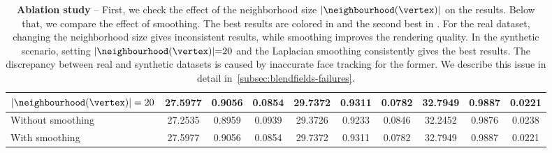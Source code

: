 \begin{table}[!t]
{\begin{tabular}{lccccccccc}
      $|\neighbourhood(\vertex)| = 20$ & \cellcolor{firstbestcolor}27.5977      & \cellcolor{firstbestcolor}0.9056         & \cellcolor{firstbestcolor}0.0854         & 29.7372                            & 0.9311                            & \cellcolor{firstbestcolor}0.0782  & \cellcolor{firstbestcolor}32.7949  & \cellcolor{firstbestcolor}0.9887  & \cellcolor{firstbestcolor}0.0221  \\
      \midrule
      Without smoothing                & \cellcolor{secondbestcolor}27.2535     & \cellcolor{secondbestcolor}0.8959        & \cellcolor{secondbestcolor}0.0939        & \cellcolor{secondbestcolor}29.3726 & \cellcolor{secondbestcolor}0.9233 & \cellcolor{secondbestcolor}0.0846 & \cellcolor{secondbestcolor}32.2452 & \cellcolor{secondbestcolor}0.9876 & \cellcolor{secondbestcolor}0.0238 \\
      With smoothing                   & \cellcolor{firstbestcolor}27.5977      & \cellcolor{firstbestcolor}0.9056         & \cellcolor{firstbestcolor}0.0854         & \cellcolor{firstbestcolor}29.7372  & \cellcolor{firstbestcolor}0.9311  & \cellcolor{firstbestcolor}0.0782  & \cellcolor{firstbestcolor}32.7949  & \cellcolor{firstbestcolor}0.9887  & \cellcolor{firstbestcolor}0.0221  \\
      \bottomrule
    \end{tabular}
  }
  \caption[Ablation study of components introduced in \blendfields]{\textbf{Ablation study} -- {
  First, we check the effect of the neighborhood size $|\neighbourhood(\vertex)|$ on the results.
  Below that, we compare the effect of smoothing.
  The best results are colored in  and the second
  best in .
  For the real dataset, changing the neighborhood size gives inconsistent
  results, while smoothing improves the rendering quality.
  In the synthetic scenario, setting $|\neighbourhood(\vertex)|{=}20$ and the
  Laplacian smoothing consistently gives the best results.
  The discrepancy between real and synthetic datasets is caused by inaccurate
  face tracking for the former.
  We describe this issue in detail in~\cref{subsec:blendfields-failures}.
  }
  }
  \label{tab:blendfields-ablation-study}
\end{table}
